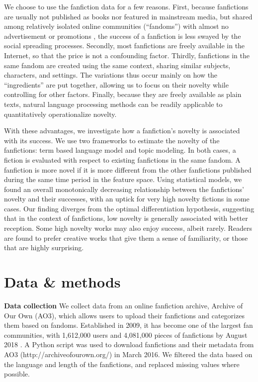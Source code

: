 \documentclass[letterpaper]{article} %
\begin{document}
We choose to use the fanfiction data for a few reasons. First, because fanfictions are usually not published as books nor featured in mainstream media, but shared among relatively isolated online communities (``fandoms'') with almost no advertisement or promotions \cite{wiki:fandom}, the success of a fanfiction is less swayed by the social spreading processes. Secondly, most fanfictions are freely available in the Internet, so that the price is not a confounding factor. Thirdly, fanfictions in the same fandom are created using the same context, sharing similar subjects, characters, and settings. The variations thus occur mainly on how the ``ingredients'' are put together, allowing us to focus on their novelty while controlling for other factors. Finally, because they are freely available as plain texts, natural language processing methods can be readily applicable to quantitatively operationalize novelty. 

With these advantages, we investigate how a fanfiction's novelty is associated with its success. We use two frameworks to estimate the novelty of the fanfictions:  term based language model and topic modeling. In both cases, a fiction is evaluated with respect to existing fanfictions in the same fandom. A fanfiction is more novel if it is more different from the other fanfictions published during the same time period in the feature space. Using statistical models, we found an overall monotonically decreasing relationship between the fanfictions' novelty and their successes, with an uptick for very high novelty fictions in some cases. Our finding diverges from the optimal differentiation hypothesis, suggesting that in the context of fanfictions, low novelty is generally associated with better reception. Some  high novelty works may also enjoy success, albeit rarely. Readers are found to prefer creative works that give them a sense of familiarity, or those that are highly surprising.

\section*{Data \& methods}

\textbf{Data collection} We collect data from an online fanfiction archive, Archive of Our Own (AO3), which allows users to upload their fanfictions and categorizes them based on fandoms. Established in 2009, it has become one of the largest fan communities, with 1,612,000 users and 4,081,000 pieces of fanfictions by August 2018 \cite{ao3stats}. A Python script was used to download fanfictions and their metadata from AO3 (http://archiveofourown.org/) in March 2016. We filtered the data based on the language and length of the fanfictions, and replaced missing values where possible. 
\end{document}
